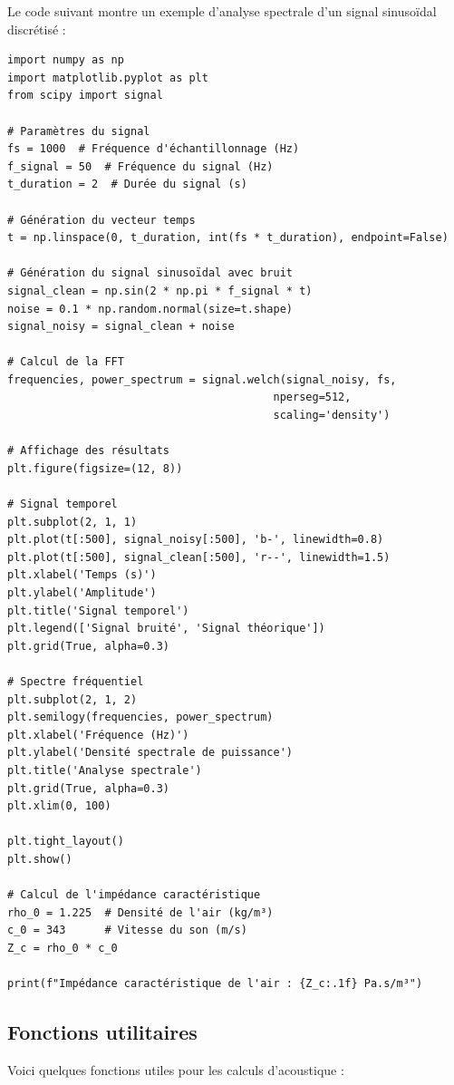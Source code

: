 Le code suivant montre un exemple d'analyse spectrale d'un signal sinusoïdal discrétisé :

\begin{verbatim}
import numpy as np
import matplotlib.pyplot as plt
from scipy import signal

# Paramètres du signal
fs = 1000  # Fréquence d'échantillonnage (Hz)
f_signal = 50  # Fréquence du signal (Hz)
t_duration = 2  # Durée du signal (s)

# Génération du vecteur temps
t = np.linspace(0, t_duration, int(fs * t_duration), endpoint=False)

# Génération du signal sinusoïdal avec bruit
signal_clean = np.sin(2 * np.pi * f_signal * t)
noise = 0.1 * np.random.normal(size=t.shape)
signal_noisy = signal_clean + noise

# Calcul de la FFT
frequencies, power_spectrum = signal.welch(signal_noisy, fs, 
                                         nperseg=512, 
                                         scaling='density')

# Affichage des résultats
plt.figure(figsize=(12, 8))

# Signal temporel
plt.subplot(2, 1, 1)
plt.plot(t[:500], signal_noisy[:500], 'b-', linewidth=0.8)
plt.plot(t[:500], signal_clean[:500], 'r--', linewidth=1.5)
plt.xlabel('Temps (s)')
plt.ylabel('Amplitude')
plt.title('Signal temporel')
plt.legend(['Signal bruité', 'Signal théorique'])
plt.grid(True, alpha=0.3)

# Spectre fréquentiel
plt.subplot(2, 1, 2)
plt.semilogy(frequencies, power_spectrum)
plt.xlabel('Fréquence (Hz)')
plt.ylabel('Densité spectrale de puissance')
plt.title('Analyse spectrale')
plt.grid(True, alpha=0.3)
plt.xlim(0, 100)

plt.tight_layout()
plt.show()

# Calcul de l'impédance caractéristique
rho_0 = 1.225  # Densité de l'air (kg/m³)
c_0 = 343      # Vitesse du son (m/s)
Z_c = rho_0 * c_0

print(f"Impédance caractéristique de l'air : {Z_c:.1f} Pa.s/m³")
\end{verbatim}

\subsection{Fonctions utilitaires}

Voici quelques fonctions utiles pour les calculs d'acoustique :

